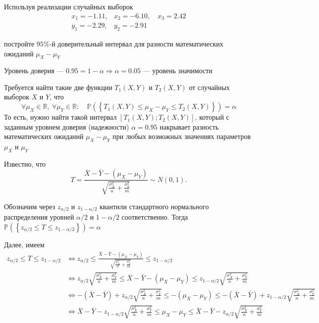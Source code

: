 \documentclass{article}
\begin{document}
Используя реализации случайных выборок
\begin{equation*}
    \begin{array}{ll}
        x_{1}=-1.11, & x_{2}=-6.10, \quad x_{3}=2.42 \\
        y_{1}=-2.29, & y_{2}=-2.91
        \end{array}
\end{equation*}

постройте $95 \%$-й доверительный интервал для разности математических ожиданий $\mu_{X}-\mu_{Y}$

Уровень доверия — $0.95=1-\alpha\Longrightarrow\alpha=0.05$ — уровень значимости%

Требуется найти такие две функции $T_{1}(X, Y)$ и $T_{2}(X, Y)$ от случайных выборок $X$ и $Y$, что
\begin{equation*}
    \forall \mu_{X} \in \mathbb{R},\ \forall \mu_{Y} \in \mathbb{R}: \quad \mathbb{P}\left(\left\{T_{1}(X, Y) \leqslant \mu_{X}-\mu_{Y} \leqslant T_{2}(X, Y)\right\}\right)=\alpha
\end{equation*}
То есть, нужно найти такой интервал $\left[T_{1}(X, Y) ; T_{2}(X, Y)\right]$, который с заданным уровнем доверия (надежности) $\alpha=0.95$ накрывает разность математических ожиданий $\mu_{X}-\mu_{Y}$ при любых возможных значениях параметров $\mu_{X}$ и $\mu_{Y}$

Известно, что
$$
T=\frac{\bar{X}-\bar{Y}-\left(\mu_{X}-\mu_{Y}\right)}{\sqrt{\frac{\sigma_{X}^{2}}{n}+\frac{\sigma_{Y}^{2}}{m}}} \sim N(0,1) .
$$

Обозначим через $z_{\alpha / 2}$ и $z_{1-\alpha / 2}$ квантили стандартного нормального распределения уровней $\alpha / 2$ и $1-\alpha / 2$ соответственно. Тогда $\mathbb{P}\left(\left\{z_{\alpha / 2} \leqslant T \leqslant z_{1-\alpha / 2}\right\}\right)=\alpha$

Далее, имеем
\begin{equation*}
    \begin{aligned}
        z_{\alpha / 2} \leqslant T \leqslant z_{1-\alpha / 2}&\Longleftrightarrow z_{\alpha / 2} \leqslant \frac{\bar{X}-\bar{Y}-\left(\mu_{X}-\mu_{Y}\right)}{\sqrt{\frac{\sigma_{X}^{2}}{n}+\frac{\sigma_{Y}^{2}}{m}}} \leqslant z_{1-\alpha / 2}\\
        &\Longleftrightarrow z_{\alpha / 2} \sqrt{\frac{\sigma_{X}^{2}}{n}+\frac{\sigma_{Y}^{2}}{m}} \leqslant \bar{X}-\bar{Y}-\left(\mu_{X}-\mu_{Y}\right) \leqslant z_{1-\alpha / 2} \sqrt{\frac{\sigma_{X}^{2}}{n}+\frac{\sigma_{Y}^{2}}{m}}\\
        &\Longleftrightarrow -(\bar{X}-\bar{Y})+z_{\alpha / 2} \sqrt{\frac{\sigma_{X}^{2}}{n}+\frac{\sigma_{Y}^{2}}{m}} \leqslant-\left(\mu_{X}-\mu_{Y}\right) \leqslant-(\bar{X}-\bar{Y})+z_{1-\alpha / 2} \sqrt{\frac{\sigma_{X}^{2}}{n}+\frac{\sigma_{Y}^{2}}{m}}\\
        &\Longleftrightarrow \bar{X}-\bar{Y}-z_{1-\alpha / 2} \sqrt{\frac{\sigma_{X}^{2}}{n}+\frac{\sigma_{Y}^{2}}{m}} \leqslant \mu_{X}-\mu_{Y} \leqslant \bar{X}-\bar{Y}-z_{\alpha / 2} \sqrt{\frac{\sigma_{X}^{2}}{n}+\frac{\sigma_{Y}^{2}}{m}}
    \end{aligned}
\end{equation*}
\end{document}
